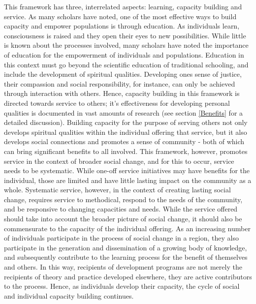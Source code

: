 This framework has three, interrelated aspects: learning, capacity building and service. As many scholars have noted, one of the most effective ways to build capacity and empower populations is through education. As individuals learn, consciousness is raised and they open their eyes to new possibilities. While little is known about the processes involved, many scholars have noted the importance of education for the empowerment of individuals and populations. %
Education in this context must go beyond the scientific education of traditional schooling, and include the development of spiritual qualities. Developing ones sense of justice, their compassion and social responsibility, for instance, can only be achieved through interaction with others. Hence, capacity building in this framework is directed towards service to others; it's effectiveness for developing personal qualities is documented in vast amounts of research (see section \ref{Benefits} for a detailed discussion). Building capacity for the purpose of serving others not only develops spiritual qualities within the individual offering that service, but it also develops social connections and promotes a sense of community - both of which can bring significant benefits to all involved. This framework, however, promotes service in the context of broader social change, and for this to occur, service needs to be systematic. While one-off service initiatives may have benefits for the individual, those are limited and have little lasting impact on the community as a whole. Systematic service, however, in the context of creating lasting social change, requires service to methodical, respond to the needs of the community, and be responsive to changing capacities and needs. While the service offered should take into account the broader picture of social change, it should also be commensurate to the capacity of the individual offering. As an increasing number of individuals participate in the process of social change in a region, they also participate in the generation and dissemination of a growing body of knowledge, and subsequently contribute to the learning process for the benefit of themselves and others. In this way, recipients of development programs are not merely the recipients of theory and practice developed elsewhere, they are active contributors to the process. Hence, as individuals develop their capacity, the cycle of social and individual capacity building continues. 



